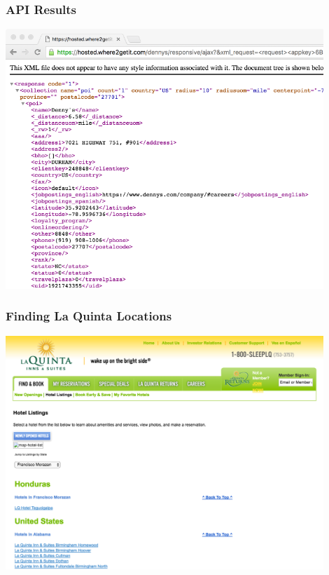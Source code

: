 \documentclass[12pt]{beamer}
\begin{document}

\begin{frame}[t]
\frametitle{API Results}

\vspace{-3mm}

\begin{center}
\includegraphics[width=0.9\textwidth]{imgs/dennys_xml_page.png}
\end{center}

\end{frame}


\begin{frame}[t]
\frametitle{Finding La Quinta Locations}

\begin{center}
\includegraphics[width=0.9\textwidth]{imgs/lq_listings.png}
\end{center}

\end{frame}
\end{document}

